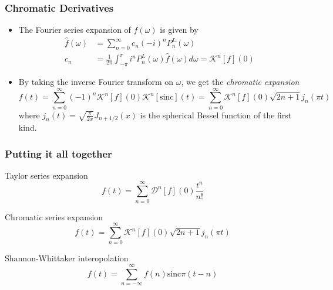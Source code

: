 \documentclass{beamer}
\begin{document}
\begin{frame}
\frametitle{Chromatic Derivatives}
\begin{itemize}
	\item The Fourier series expansion of $\hat{f}(\omega)$ is given by
		 \begin{align*}
			\hat{f}(\omega)	&= \sum_{n=0}^{\infty} c_n (-i)^n P_n^L(\omega) \\
			c_n							&= \frac{1}{2\pi} \int_{-\pi}^{\pi} i^n P_n^L(\omega) \hat{f}(\omega) d\omega
										= \mathcal{K}^n[f](0)
		\end{align*}
	\item By taking the inverse Fourier transform on $\omega$, we get the \textit{chromatic expansion}
		\begin{equation*}
			f(t)	= \sum_{n=0}^{\infty} (-1)^n  \mathcal{K}^n[f](0) \mathcal{K}^n[\mathrm{sinc}](t)
					= \sum_{n=0}^{\infty} \mathcal{K}^n[f](0) \sqrt{2n+1} j_n(\pi t)
		\end{equation*}
		where $j_n(t) = \sqrt{\frac{\pi}{2x}}J_{n+1/2}(x)$ is the spherical Bessel function of the first kind.
\end{itemize}
\end{frame}


\begin{frame}
\frametitle{Putting it all together}

\begin{block}{Taylor series expansion}
\begin{equation*}
	f(t) = \sum_{n=0}^{\infty} \mathcal{D}^n[f](0) \frac{t^n}{n!}
\end{equation*}
\end{block}

\begin{block}{Chromatic series expansion}
\begin{equation*}
	f(t) = \sum_{n=0}^{\infty} \mathcal{K}^n[f](0) \sqrt{2n+1} j_n(\pi t)
\end{equation*}
\end{block}

\begin{block}{Shannon-Whittaker interopolation}
\begin{equation*}
	f(t) = \sum_{n=-\infty}^{\infty} f(n) \mathrm{sinc}{\pi(t-n)}
\end{equation*}
\end{block}

\end{frame}
\end{document}
